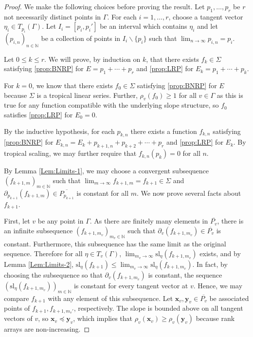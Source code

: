 \documentclass{amsart}
\begin{document}
	\begin{proof}
		We make the following choices before proving the result. Let $p_1, \ldots, p_r$ be $r$ not necessarily distinct points in $\Gamma$. For each $i = 1, \ldots, r$, choose a tangent vector $\eta_i \in T_{p_i}(\Gamma)$. Let $I_i = [p_i, p_i']$ be an interval which contains $\eta_i$ and let $(p_{i,n})_{n \in \mathbb{N}}$ be a collection of points in $I_i \backslash \{ p_{i} \}$ such that $\displaystyle \lim_{n \to \infty} p_{i,n} = p_i$.
		
		Let $0 \leq k \leq r$. We will prove, by induction on $k$, that there exists $f_{k} \in \Sigma$ satisfying \ref{prop:BNRP} for $E = p_1 + \cdots + p_r$ and \ref{prop:LRP} for $E_{k} = p_1 + \cdots + p_{k}$.
		
		For $k=0$, we know that there exists $f_0 \in \Sigma$ satisfying \ref{prop:BNRP} for $E$ because $\Sigma$ is a tropical linear series. Further, $\rho_v(f_0) \geq 1$ for all $v \in \Gamma$ as this is true for any function compatible with the underlying slope structure, so $f_0$ satisfies \ref{prop:LRP} for $E_0 = 0$.
		
		By the inductive hypothesis, for each $p_{k,n}$ there exists a function $f_{k,n}$ satisfying \ref{prop:BNRP} for $E_{k,n} = E_{k} + p_{k+1,n} + p_{k+2} + \cdots + p_r$ and \ref{prop:LRP} for $E_{k}$. By tropical scaling, we may further require that $f_{k,n}(p_k) = 0$ for all $n$.
		
		By Lemma \ref{Lem:Limits-1}, we may choose a convergent subsequence $(f_{k+1,m})_{m \in \mathbb{N}}$ such that $\displaystyle \lim_{m \to \infty} f_{k+1,m} = f_{k+1} \in \Sigma$ and $\partial_{p_{k+1}}(f_{k+1,m}) \in \overline{P_{p_{k+1}}}$ is constant for all $m$. We now prove several facts about $f_{k+1}$.
		
		First, let $v$ be any point in $\Gamma$. As there are finitely many elements in $\overline{P_v}$, there is an infinite subsequence $(f_{k+1,m_v})_{m_v \in \mathbb{N}}$ such that $\partial_{v}(f_{k+1,m_v}) \in \overline{P_v}$ is constant. Furthermore, this subsequence has the same limit as the original sequence. Therefore for all $\eta \in T_v(\Gamma)$, $\displaystyle \lim_{m_v \to \infty} \mathrm{sl}_{\eta}(f_{k+1,m_v})$ exists, and by Lemma \ref{Lem:Limits-2}, $\displaystyle \mathrm{sl}_{\eta}(f_{k+1}) \leq \lim_{m_v \to \infty} \mathrm{sl}_{\eta}(f_{k+1,m_v})$. In fact, by choosing the subsequence so that $\partial_{v}(f_{k+1,m_v})$ is constant, the sequence $(\mathrm{sl}_{\eta}(f_{k+1,m_v}))_{m \in\mathbb{N}}$ is constant for every tangent vector at $v$. Hence, we may compare $f_{k+1}$ with any element of this subsequence. Let $\mathbf{x}_v, \mathbf{y}_v \in \overline{P_v}$ be associated points of $f_{k+1}, f_{k+1,m_v'}$, respectively. The slope is bounded above on all tangent vectors of $v$, so $\mathbf{x}_v \preceq \mathbf{y}_v$, which implies that $\rho_v(\mathbf{x}_v) \geq \rho_v(\mathbf{y}_v)$ because rank arrays are non-increasing.
		

\end{proof}
\end{document}

